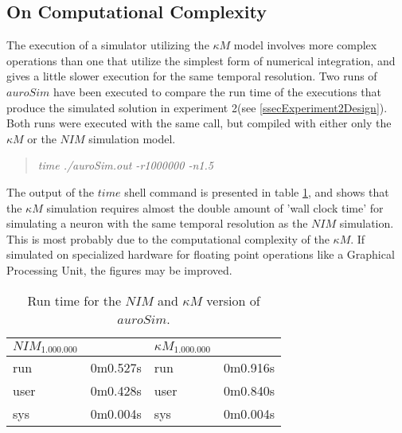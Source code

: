 	\subsection{On Computational Complexity}
	\label{ssecOnComputationalComlexity}
		The execution of a simulator utilizing the $\kappa M$ model involves more complex operations than one that utilize the simplest form of numerical integration, and gives a little slower execution for the same temporal resolution.
		Two runs of $auroSim$ have been executed to compare the run time of the executions that produce the simulated solution in experiment 2(see \ref{ssecExperiment2Design}).
		Both runs were executed with the same call, but compiled with either only the $\kappa M$ or the $NIM$ simulation model.
\begin{quote}
	\emph{time ./auroSim.out -r1000000 -n1.5}
\end{quote}

		The output of the $time$ shell command is presented in table \ref{tabRunTimesForImplementationOfSANNandKM}, and shows that the $\kappa M$ simulation requires almost the double amount of 'wall clock time' for simulating a neuron with the same temporal resolution as the $NIM$ simulation.
		This is most probably due to the computational complexity of the $\kappa M$.
		If simulated on specialized hardware for floating point operations like a Graphical Processing Unit, the figures may be improved.

\begin{table} %
	\centering
	\begin{tabular}{|lc|lc|}
		\hline 
		$NIM_{1.000.000}$ &  & $\kappa M_{1.000.000}$ & \\
		\hline
		run 	& 0m0.527s 	& run 	& 0m0.916s \\
		user 	& 0m0.428s 	& user 	& 0m0.840s \\
		sys 	& 0m0.004s 	& sys 	& 0m0.004s 
		\\ \hline 
	\end{tabular}
	\caption{Run time for the $NIM$ and $\kappa M$ version of $auroSim$. }
	\label{tabRunTimesForImplementationOfSANNandKM}
\end{table}

